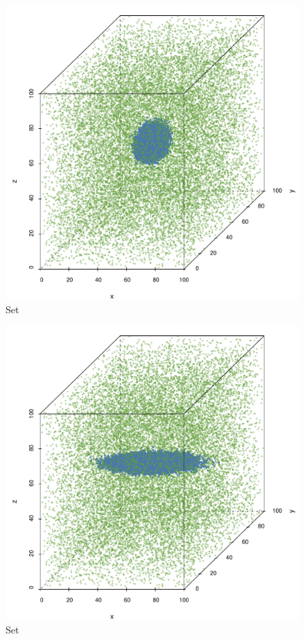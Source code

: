 \begin{subfigure}{0.23\textwidth}
	\centering
	\includegraphics[width=\textwidth]{experiment/img/datasetplot_ferdosi_1_60000}
	\caption{Set \ferdosiOne}
	\label{fig:3:simulated:datasets:ferdosi1}
\end{subfigure}
\begin{subfigure}{0.23\textwidth}
	\centering
	\includegraphics[width=\textwidth]{experiment/img/datasetplot_baakman_1_60000}
	\caption{Set \baakmanOne}
	\label{fig:3:simulated:datasets:baakman1}
\end{subfigure}
